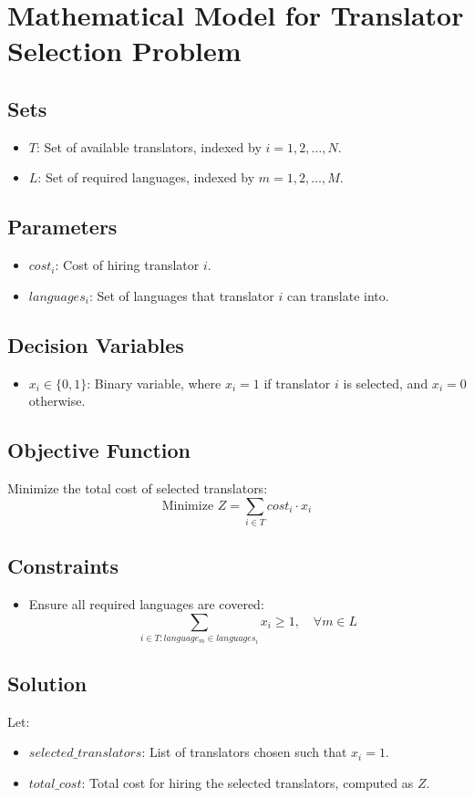\documentclass{article}
\begin{document}
\section*{Mathematical Model for Translator Selection Problem}

\subsection*{Sets}
\begin{itemize}
    \item $T$: Set of available translators, indexed by $i = 1, 2, \ldots, N$.
    \item $L$: Set of required languages, indexed by $m = 1, 2, \ldots, M$.
\end{itemize}

\subsection*{Parameters}
\begin{itemize}
    \item $cost_i$: Cost of hiring translator $i$.
    \item $languages_i$: Set of languages that translator $i$ can translate into.
\end{itemize}

\subsection*{Decision Variables}
\begin{itemize}
    \item $x_i \in \{0, 1\}$: Binary variable, where $x_i = 1$ if translator $i$ is selected, and $x_i = 0$ otherwise.
\end{itemize}

\subsection*{Objective Function}
Minimize the total cost of selected translators:
\[
\text{Minimize } Z = \sum_{i \in T} cost_i \cdot x_i
\]

\subsection*{Constraints}
\begin{itemize}
    \item Ensure all required languages are covered:
    \[
    \sum_{i \in T: language_m \in languages_i} x_i \geq 1, \quad \forall m \in L
    \]
\end{itemize}

\subsection*{Solution}
Let:
\begin{itemize}
    \item $selected\_translators$: List of translators chosen such that $x_i = 1$.
    \item $total\_cost$: Total cost for hiring the selected translators, computed as $Z$.
\end{itemize}
\end{document}
